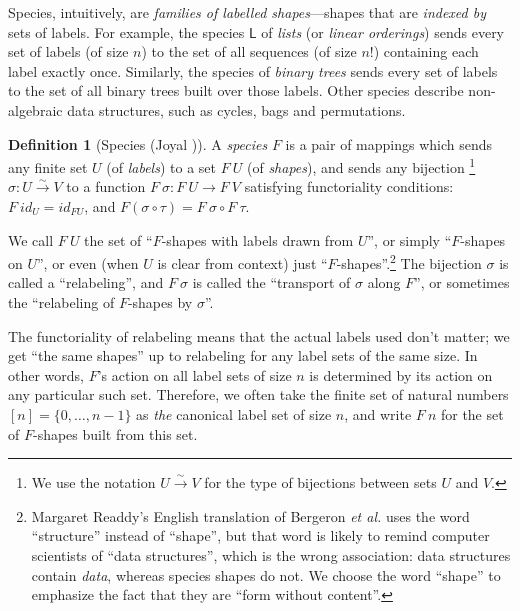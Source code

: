 \documentclass[preprint,authoryear]{sigplanconf}
\newcommand{\pref}[1]{\prettyref{#1}}
\newcommand{\etal}{\latin{et al.}\xspace}
\newcommand{\term}[1]{\emph{#1}}
\newcommand{\latin}[1]{\textit{#1}}
\newcommand{\msf}[1]{\ensuremath{\mathsf{#1}}\xspace}
\newcommand{\bij}{\stackrel{\sim}{\longrightarrow}}
\theoremstyle{definition}
\newtheorem{defn}[thm]{Definition}
\theoremstyle{remark}
\providecommand{\Sp}{}
\renewcommand{\Sp}{\msf}
\renewcommand{\L}{\Sp{L}}
\begin{document}
Species, intuitively, are \emph{families of labelled shapes}---shapes
that are \emph{indexed by} sets of labels.  For example, the species
$\L$ of \emph{lists} (or \emph{linear orderings}) sends every set of
labels (of size $n$) to the set of all sequences (of size $n!$)
containing each label exactly once.  Similarly, the species of
\emph{binary trees} sends every set of labels to the set of all binary
trees built over those labels.  Other species describe non-algebraic
data structures, such as cycles, bags and permutations.

\begin{defn}[Species (Joyal \cite{joyal,bll})]
\label{defn:species-set}
A \term{species} $F$ is a pair of mappings which sends any finite set
$U$ (of \term{labels}) to a set $F\ U$ (of \term{shapes}), and sends
any bijection%
\footnote{We use the notation $U \bij V$ for the type of bijections
  between sets $U$ and $V$.} $\sigma : U \bij V$ to a function $F\
\sigma : F\ U \to F\ V$
satisfying functoriality conditions:
$F\ id_U = id_{F U}$, and
$F (\sigma \circ \tau) = F\ \sigma \circ F\ \tau$.
\end{defn}

We call $F\ U$ the set of ``\mbox{$F$-shapes} with labels drawn from $U$'',
or simply ``\mbox{$F$-shapes} on $U$'', or even (when $U$ is clear from
context) just ``\mbox{$F$-shapes}''.\footnote{Margaret Readdy's English translation
  of Bergeron \etal \cite{bll} uses the word ``structure'' instead of
  ``shape'', but that word is likely to remind computer scientists of
  ``data structures'', which is the wrong association: data structures
  contain \emph{data}, whereas species shapes do not.  We choose the
  word ``shape'' to emphasize the fact that they are ``form without
  content''.} The bijection $\sigma$ is called a ``relabeling'', and $F\ \sigma$ is called the ``transport of $\sigma$ along
$F$'', or sometimes the ``relabeling of \mbox{$F$-shapes} by $\sigma$''.

The functoriality of relabeling means that the actual labels used
don't matter; we get ``the same shapes'' up to relabeling for any
label sets of the same size.  In other words, $F$'s action on all
label sets of size $n$ is determined by its action on any particular
such set. Therefore, we often take the finite set of natural numbers $[n] = \{0,
\dots, n-1\}$ as \emph{the} canonical label set of size $n$, and write
$F\ n$ for the set of $F$-shapes built from this set.
\end{document}
